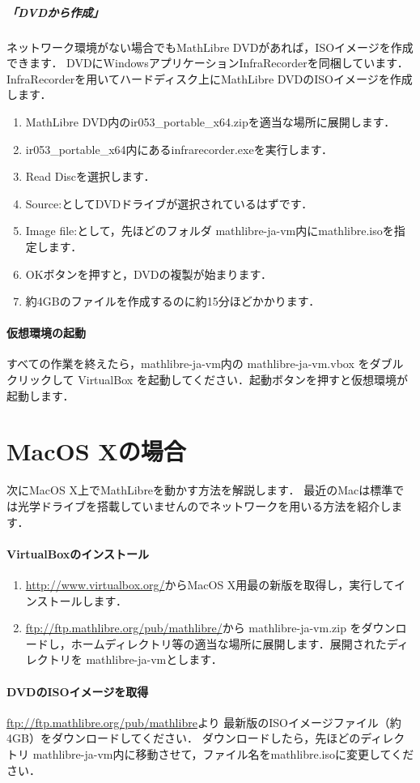 \documentclass[a4j]{ltjsarticle}
\newcommand{\ir}{ir053\_portable\_x64}
\newcommand{\vm}{mathlibre-ja-vm}
\begin{document}
\subparagraph{「DVDから作成」}
ネットワーク環境がない場合でもMathLibre DVDがあれば，ISOイメージを作成できます．
DVDにWindowsアプリケーションInfraRecorderを同梱しています．
InfraRecorderを用いてハードディスク上にMathLibre DVDのISOイメージを作成
します．
\begin{enumerate}
 \item MathLibre DVD内の\ir.zipを適当な場所に展開します．
 \item \ir 内にあるinfrarecorder.exeを実行します．
 \item Read Discを選択します．
 \item Source:としてDVDドライブが選択されているはずです．
 \item Image file:として，先ほどのフォルダ \vm 内にmathlibre.isoを指定します．
 \item OKボタンを押すと，DVDの複製が始まります．
 \item 約4GBのファイルを作成するのに約15分ほどかかります．
\end{enumerate}

\paragraph{仮想環境の起動}
すべての作業を終えたら，\vm 内の \vm.vbox をダブルクリックして
VirtualBox を起動してください．起動ボタンを押すと仮想環境が起動します．

\section{MacOS Xの場合}
次にMacOS X上でMathLibreを動かす方法を解説します．
最近のMacは標準では光学ドライブを搭載していませんのでネットワークを用いる方法を紹介します．
\paragraph{VirtualBoxのインストール}
\begin{enumerate}
 \item \url{http://www.virtualbox.org/}からMacOS X用最の新版を取得し，実行してインストールします．
 \item \url{ftp://ftp.mathlibre.org/pub/mathlibre/}から \vm.zip をダウンロードし，ホームディレクトリ等の適当な場所に展開します．展開されたディレクトリを \vm とします．
\end{enumerate}

\paragraph{DVDのISOイメージを取得}
\url{ftp://ftp.mathlibre.org/pub/mathlibre}より
最新版のISOイメージファイル（約4GB）をダウンロードしてください．
ダウンロードしたら，先ほどのディレクトリ \vm 内に移動させて，ファイル名をmathlibre.isoに変更してください．
\end{document}
